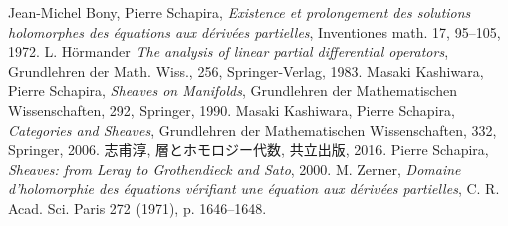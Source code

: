 \begin{thebibliography}{20} 
     Jean-Michel Bony, Pierre Schapira, 
    \textit{Existence et prolongement des solutions holomorphes 
    des \'equations aux d\'eriv\'ees partielles}, Inventiones math. 17, 95--105, 1972.
     L. H\"ormander 
    \textit{The analysis of linear partial differential operators}, 
    Grundlehren der Math. Wiss., 256, Springer-Verlag, 1983.
     Masaki Kashiwara, Pierre Schapira, 
        \textit{Sheaves on Manifolds}, 
        Grundlehren der Mathematischen Wissenschaften, 292, Springer, 1990.
     Masaki Kashiwara, Pierre Schapira, 
        \textit{Categories and Sheaves}, 
        Grundlehren der Mathematischen Wissenschaften, 332, Springer, 2006.
     志甫淳, 層とホモロジー代数, 共立出版, 2016.
     Pierre Schapira, \textit{Sheaves: from Leray to Grothendieck and Sato}, 2000.
    M. Zerner, \textit{Domaine d'holomorphie des \'equations v\'erifiant une \'equation aux d\'eriv\'ees partielles}, 
    C. R. Acad. Sci. Paris 272 (1971), p. 1646--1648.
\end{thebibliography}



